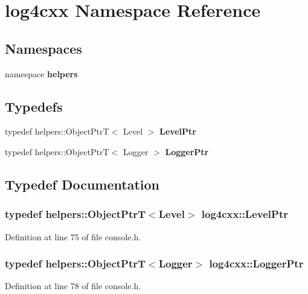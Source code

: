 \section{log4cxx Namespace Reference}
\label{namespacelog4cxx}
\subsection*{Namespaces}
\begin{DoxyCompactItemize}
\item 
namespace {\bf helpers}
\end{DoxyCompactItemize}
\subsection*{Typedefs}
\begin{DoxyCompactItemize}
\item 
typedef helpers::ObjectPtrT$<$ Level $>$ {\bf LevelPtr}
\item 
typedef helpers::ObjectPtrT$<$ Logger $>$ {\bf LoggerPtr}
\end{DoxyCompactItemize}


\subsection{Typedef Documentation}
\subsubsection[{LevelPtr}]{\setlength{\rightskip}{0pt plus 5cm}typedef helpers::ObjectPtrT$<$Level$>$ {\bf log4cxx::LevelPtr}}\label{namespacelog4cxx_ad2b53d346799bc8ec704d0c23cb64e55}


Definition at line 75 of file console.h.

\subsubsection[{LoggerPtr}]{\setlength{\rightskip}{0pt plus 5cm}typedef helpers::ObjectPtrT$<$Logger$>$ {\bf log4cxx::LoggerPtr}}\label{namespacelog4cxx_a419b8974afa316fc38d3cfbb16077964}


Definition at line 78 of file console.h.

